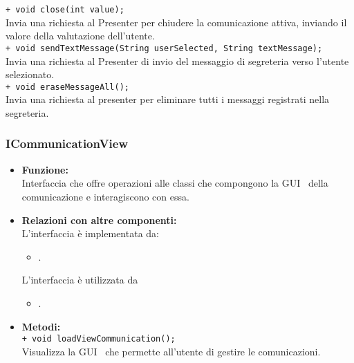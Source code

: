 {\begin{sloppypar}
{{\begin{itemize}
				\texttt{+ void close(int value);}\\
				Invia una richiesta al Presenter per chiudere la comunicazione attiva, inviando il 
				valore della valutazione dell'utente.\\
				
				\texttt{+ void sendTextMessage(String userSelected, String textMessage);}\\
				Invia una richiesta al Presenter di invio del messaggio di segreteria verso l'utente selezionato.\\
				
				\texttt{+ void eraseMessageAll();}\\
				Invia una richiesta al presenter per eliminare tutti i messaggi registrati nella segreteria.\\
		\end{itemize}
		}
		
	\subsubsection{ICommunicationView}\label{ssub:ICommunicationView}{
			\begin{itemize}
				\item[] \textbf{Funzione:} \\ 
					Interfaccia che offre operazioni alle classi che compongono la GUI\g~ della comunicazione e interagiscono con essa.\\

				\item[]  \textbf{Relazioni con altre componenti:} \\
					L'interfaccia è implementata da:
					\begin{itemize}
						\item[] .
					\end{itemize}
					L'interfaccia è utilizzata da
					\begin{itemize}
						\item[] .\\
					\end{itemize}

				\item[] \textbf{Metodi:} \\
					\texttt{+ void loadViewCommunication();} \\
					Visualizza la GUI\g~ che permette all'utente di gestire le comunicazioni.\\


\end{itemize}}}
\end{sloppypar}}
